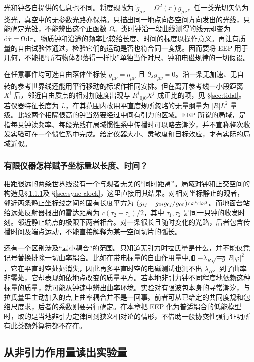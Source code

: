 光和钟各自提供的信息也不同。将度规改为 $\tilde g_{\mu\nu}=\Omega^2(x)g_{\mu\nu}$，任一类光切矢仍为类光，真空中的无参数光路亦保持。只描出同一地点向各空间方向发出的光线，只能确定光锥，不能辨出这个正函数 $\Omega$。类时钟沿一段曲线测得的线元却变为 $\dd\tilde\tau=\Omega\dd\tau$。物质钟和沿途的频率比较给长度、时间的标度以操作意义。再让有质量的自由试验体通过，检验它们的运动是否也符合同一度规。因而要将 EEP 用于几何，不能把“所有物体都落得一样快”单独当作对尺、钟和电磁规律的一切假设。

在任意事件均可选自由落体坐标使 $g_{\mu\nu}=\eta_{\mu\nu}$ 且 $\partial_\lambda g_{\mu\nu}=0$。沿一条无加速、无自转的参考世界线还能用平行移动的标架作相同安排。但在离开参考线一小段距离 $X^i$ 后，邻近自由质点的相对加速度出现与 $R^i{}_{0j0}X^j$ 成正比的项，见 \S\ref{sec:tidal}。若仪器特征长度为 $L$，在其范围内改用平直度规所忽略的无量纲量为 $|R|L^2$ 量级。比较两个相隔很高的钟当然要经过中间有引力的区域。EEP 所说的局域，是指每只钟读频率、每段光线在局域惯性系中传播时可以略去潮汐，并不宣称整次收发实验可在一个惯性系中完成。给定仪器大小、灵敏度和目标效应，才有实际的局域近似。

\subsubsection{有限仪器怎样赋予坐标量以长度、时间？}

相距很远的两条世界线没有一个与观者无关的“同时距离”。局域对钟和正交空间的构造见\hyperlink{subsection.1.1.1}{\S\,1.1.1}及 \S\ref{sec:sync-clock}，这里直接用其结果。对相对坐标静止的观者，邻近两条静止坐标线之间的固有长度平方为 $(g_{ij}-g_{0i}g_{0j}/g_{00})\dd x^i\dd x^j$。而地面台站给远处反射器报出的雷达距离为 $c(\tau_2-\tau_1)/2$，其中 $\tau_1,\tau_2$ 是同一只钟的收发时刻。邻近静止端点的极限下两者相合。对一条很长且随时变化的光路，后者包含传播时间及端点运动，不能直接解释为某一空间切片的弧长。

还有一个区别涉及“最小耦合”的范围。只知道无引力时拉氏量是什么，并不能仅凭记号替换排除一切曲率耦合。比如在带电标量的自由作用量中加 $-\lambda_R\sqrt{-g}\,R|\varphi|^2$，它在平直时空处处消失，因此再多平直时空的电磁测试也测不出 $\lambda_R$。到了曲率非零处，它却表现如依地点改变的质量平方。若本地非引力钟不同程度地依赖这种标量的质量，就可能从钟速中辨出曲率环境。实验对有限波包本身的寻常潮汐，与拉氏量里主动加入的点上曲率耦合并不是一回事。前者可从已给定的共同度规和包络尺度求，后者的系数则要另行确定。在本章把 EEP 化为普适耦合的低能模型时，取的是当地非引力定律回到狭义相对论的情形，不借助一般协变性强行证明所有此类额外算符都不存在。

\subsection{从非引力作用量读出实验量}

